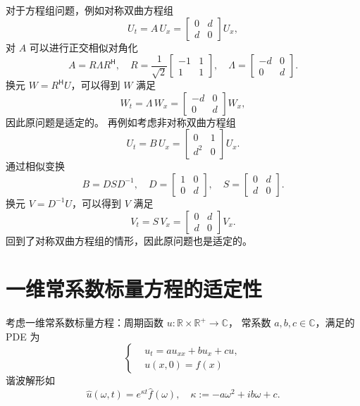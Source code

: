 对于方程组问题，例如对称双曲方程组
\[
    U_t = A\,U_x =
    \begin{bmatrix}
        0 & d \\
        d & 0
    \end{bmatrix}
    U_x,
\]
对 $A$ 可以进行正交相似对角化
\[
    A = R \Lambda R^\mathsf{H},\quad
    R = \frac{1}{\sqrt{2}}
    \begin{bmatrix}
        -1 & 1 \\
        1  & 1
    \end{bmatrix},\quad
    \Lambda =
    \begin{bmatrix}
        -d & 0 \\
        0  & d
    \end{bmatrix}.
\]
换元 $W  = R^\mathsf{H} U$，可以得到 $W$ 满足
\[
    W_t = \Lambda\,W_x =
    \begin{bmatrix}
        -d & 0 \\
        0  & d
    \end{bmatrix}
    W_x,
\]
因此原问题是适定的。
再例如考虑非对称双曲方程组
\[
    U_t = B\,U_x =
    \begin{bmatrix}
        0   & 1 \\
        d^2 & 0
    \end{bmatrix}
    U_x.
\]
通过相似变换
\[
    B = D S D^{-1},\quad
    D =
    \begin{bmatrix}
        1 & 0 \\
        0 & d
    \end{bmatrix},\quad
    S =
    \begin{bmatrix}
        0 & d \\
        d & 0
    \end{bmatrix}.
\]
换元 $V = D^{-1} U$，可以得到 $V$ 满足
\[
    V_t = S\,V_x =
    \begin{bmatrix}
        0 & d \\
        d & 0
    \end{bmatrix}
    V_x.
\]
回到了对称双曲方程组的情形，因此原问题也是适定的。

\section{一维常系数标量方程的适定性}

考虑一维常系数标量方程：周期函数 $u: \mathbb{R} \times \mathbb{R}^+ \to \mathbb{C}$，
常系数 $a,b,c \in \mathbb{C}$，满足的 PDE 为
\begin{equation}
    \left\{
    \begin{aligned}
         & u_t = a u_{xx} + b u_x + c u, \\
         & u(x,0) = f(x)
    \end{aligned}
    \right.
    \label{eq:1d-pde-scalar}
\end{equation}
谐波解形如
\[
    \hat{u}(\omega,t) = e^{\kappa t} \hat{f}(\omega), \quad  \kappa := -a \omega ^2 + i b \omega  + c.
\]

